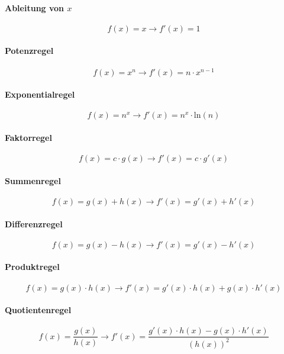 \documentclass[a4paper, 11pt, accentcolor = tud3b]{tudreport}
\begin{document}
                \paragraph{Ableitung von $ x $}
                    \[ f(x) = x \rightarrow f'(x) = 1 \]

                \paragraph{Potenzregel}
                    \[ f(x) = x ^ n \rightarrow f'(x) = n \cdot x ^ { n - 1 } \]

                \paragraph{Exponentialregel}
                    \[ f(x) = n ^ x \rightarrow f'(x) = n ^ x \cdot \text{ln}(n) \]

                \paragraph{Faktorregel}
                    \[ f(x) = c \cdot g(x) \rightarrow f'(x) = c \cdot g'(x) \]

                \paragraph{Summenregel}
                    \[ f(x) = g(x) + h(x) \rightarrow f'(x) = g'(x) + h'(x) \]

                \paragraph{Differenzregel}
                    \[ f(x) = g(x) - h(x) \rightarrow f'(x) = g'(x) - h'(x) \]

                \paragraph{Produktregel}
                    \[ f(x) = g(x) \cdot h(x) \rightarrow f'(x) = g'(x) \cdot h(x) + g(x) \cdot h'(x) \]

                \paragraph{Quotientenregel}
                    \[ f(x) = \frac{g(x)}{h(x)} \rightarrow f'(x) = \frac{g'(x) \cdot h(x) - g(x) \cdot h'(x)}{(h(x)) ^ 2} \]
\end{document}
